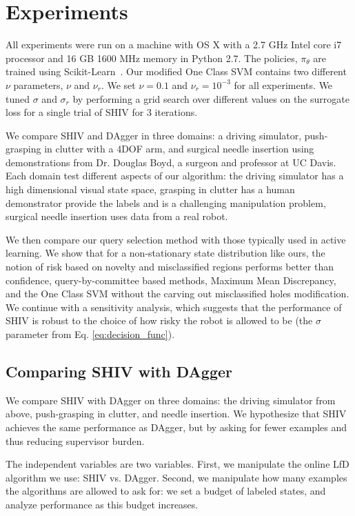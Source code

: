 \documentclass[10pt, conference]{ieeeconf}      %
\begin{document}
\section{Experiments}\label{sec:experiments}

All experiments were run on a machine with OS X with a 2.7 GHz Intel core i7 processor and 16 GB
1600 MHz memory in Python 2.7. The policies, $\pi_\theta$ are trained using Scikit-Learn~\cite{scikit-learn}. Our modified One Class SVM contains two different $\nu$ parameters, $\nu$ and $\nu_r$. We set $\nu = 0.1$ and $\nu_r =10^{-3}$ for all experiments. We tuned $\sigma$ and $\sigma_r$ by performing a grid search over different values on the surrogate loss for a single trial of SHIV for 3 iterations.

We compare SHIV and DAgger in three domains: a driving simulator, push-grasping in clutter with a 4DOF arm, and surgical needle insertion using demonstrations from Dr. Douglas Boyd, a surgeon and professor at UC Davis. Each domain test different aspects of our algorithm: the driving simulator has a high dimensional visual state space, grasping in clutter has a human demonstrator provide the labels and is a challenging manipulation problem, surgical needle insertion uses data from a real robot. 

We then  compare our query selection method with those typically used in active learning. We show that for a non-stationary state distribution like ours, the notion of risk based on novelty and misclassified regions performs better than confidence, query-by-committee based methods, Maximum Mean Discrepancy, and the One Class SVM without the carving out misclassified holes modification. We continue with a sensitivity analysis, which suggests that the performance of SHIV is robust to the choice of how risky the robot is allowed to be (the $\sigma$ parameter from Eq. \ref{eq:decision_func}).




\subsection{Comparing SHIV with DAgger}
We compare SHIV with DAgger on three domains: the driving simulator from above, push-grasping in clutter, and needle insertion. We hypothesize that SHIV achieves the same performance as DAgger, but by asking for fewer examples and thus reducing supervisor burden.

The independent variables are two variables. First, we manipulate the online LfD algorithm we use: SHIV vs. DAgger. Second, we manipulate how many examples the algorithms are allowed to ask for: we set a budget of labeled states, and analyze performance as this budget increases.
\end{document}
